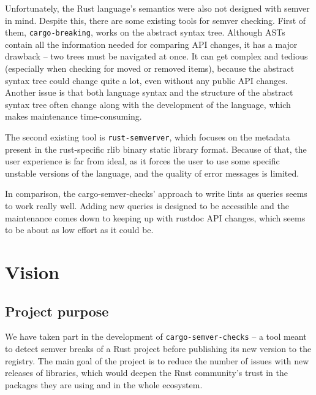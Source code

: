 \documentclass[licencjacka,en]{pracamgr}
\begin{document}
Unfortunately, the Rust language's semantics were also not designed with semver in mind.
Despite this, there are some existing tools for semver checking. First of them,
\texttt{cargo-breaking}, works on the abstract syntax tree. Although ASTs contain all the
information needed for comparing API changes, it has a major drawback -- two trees must be
navigated at once. It can get complex and tedious (especially when checking for moved or removed
items), because the abstract syntax tree could change quite a lot, even without any public API
changes. Another issue is that both language syntax and the structure of the abstract syntax tree
often change along with the development of the language, which makes maintenance time-consuming.

The second existing tool is \texttt{rust-semverver}, which focuses on the metadata present in the
rust-specific rlib binary static library format. Because of that, the user experience is far from
ideal, as it forces the user to use some specific unstable versions of the language, and the
quality of error messages is limited.

In comparison, the cargo-semver-checks' approach to write lints as queries seems to work
really well. Adding new queries is designed to be accessible and the maintenance comes down to
keeping up with rustdoc API changes, which seems to be about as low effort as it could be.


\chapter{Vision}\label{r:chapter_vision}

\section{Project purpose}\label{r:section_project_purpose}

We have taken part in the development of \texttt{cargo-semver-checks} -- a tool meant to detect
semver breaks of a Rust project before publishing its new version to the registry. The main goal
of the project is to reduce the number of issues with new releases of libraries, which would deepen
the Rust community's trust in the packages they are using and in the whole ecosystem.
\end{document}
